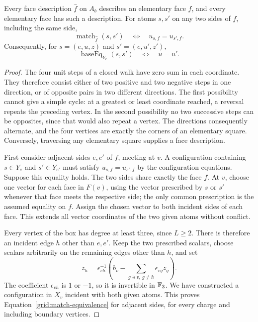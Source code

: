 \begin{lemma}\label{grid:matching}
Every face description $\widehat f$ on $A_b$ describes an elementary face
$f$, and every elementary face has such a description.  For atoms $s,s'$
on any two sides of $f$, including the same side,
\begin{equation}\label{grid:match-equivalence}
 \operatorname{match}_{\widehat f}(s,s')
 \quad\Longleftrightarrow\quad u_{s,f}=u_{s',f}.
\end{equation}
Consequently, for $s=(e,u,z)$ and $s'=(e,u',z')$,
\begin{equation}\label{grid:base-equivalence}
 \operatorname{baseEq}_{Y_e}(s,s')\quad\Longleftrightarrow\quad u=u'.
\end{equation}
\end{lemma}
\begin{proof}
The four unit steps of a closed walk have zero sum in each coordinate.
They therefore consist either of two positive and two negative steps
in one direction, or of opposite pairs in two different directions.
The first possibility cannot give a simple cycle: at a greatest or least
coordinate reached, a reversal repeats the preceding vertex.  In the
second possibility no two successive steps can be opposites, since that
would also repeat a vertex.  The directions consequently alternate, and
the four vertices are exactly the corners of an elementary square.
Conversely, traversing any elementary square supplies a face description.

First consider adjacent sides $e,e'$ of $f$, meeting at $v$.  A
configuration containing $s\in Y_e$ and $s'\in Y_{e'}$ must satisfy
$u_{s,f}=u_{s',f}$ by the configuration equations.  Suppose this equality
holds.  The two sides share exactly the face $f$.  At $v$, choose one
vector for each face in $F(v)$, using the vector prescribed by $s$ or
$s'$ whenever that face meets the respective side; the only common
prescription is the assumed equality on $f$.  Assign the chosen vector
to both incident sides of each face.  This extends all vector coordinates
of the two given atoms without conflict.

Every vertex of the box has degree at least three, since $L\ge2$.
There is therefore an incident edge $h$ other than $e,e'$.  Keep the two
prescribed scalars, choose scalars arbitrarily on the remaining edges
other than $h$, and set
\[
 z_h=\epsilon_{vh}^{-1}
       \left(b_v-\sum_{g\ni v,\ g\ne h}\epsilon_{vg}z_g\right).
\]
The coefficient $\epsilon_{vh}$ is $1$ or $-1$, so it is invertible in
$\mathbb F_3$.  We have constructed a configuration in $X_v$ incident with both
given atoms.  This proves Equation~\eqref{grid:match-equivalence} for
adjacent sides, for every charge and including boundary vertices.


\end{proof}
